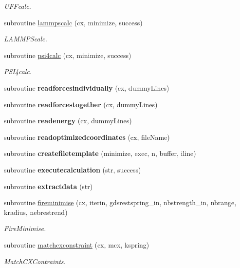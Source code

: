 \begin{DoxyCompactItemize}
\begin{DoxyCompactList}\small\item\em U\+F\+Fcalc. \end{DoxyCompactList}\item 
subroutine \mbox{\hyperlink{namespacepes_a04f0797f2fcc51b261d97b0b2f014254}{lammpscalc}} (cx, minimize, success)
\begin{DoxyCompactList}\small\item\em L\+A\+M\+M\+P\+Scalc. \end{DoxyCompactList}\item 
subroutine \mbox{\hyperlink{namespacepes_af090baa63d75251c8a0d59fa6a0e5ab7}{psi4calc}} (cx, minimize, success)
\begin{DoxyCompactList}\small\item\em P\+S\+I4calc. \end{DoxyCompactList}\item 
\mbox{\label{namespacepes_a3496810618e93c982ad8323a9c065ea8}} 
subroutine {\bfseries readforcesindividually} (cx, dummy\+Lines)
\item 
\mbox{\label{namespacepes_a975ac201244ea09f52437de130b111e2}} 
subroutine {\bfseries readforcestogether} (cx, dummy\+Lines)
\item 
\mbox{\label{namespacepes_adc61696110e289b0a4855b7de2eee923}} 
subroutine {\bfseries readenergy} (cx, dummy\+Lines)
\item 
\mbox{\label{namespacepes_ac7e8fcaa416028b21afaa5a102657105}} 
subroutine {\bfseries readoptimizedcoordinates} (cx, file\+Name)
\item 
\mbox{\label{namespacepes_a3c28a0b18ef26d0a41522e0c0ab88b42}} 
subroutine {\bfseries createfiletemplate} (minimize, exec, n, buffer, iline)
\item 
\mbox{\label{namespacepes_a7518f38a27ed0fe7d940eb9832d4143f}} 
subroutine {\bfseries executecalculation} (str, success)
\item 
\mbox{\label{namespacepes_a3e3f3e53db69ad2009b7c91795f32bf5}} 
subroutine {\bfseries extractdata} (str)
\item 
subroutine \mbox{\hyperlink{namespacepes_ad09cee72e0fef4317231efc6b7cf35fd}{fireminimise}} (cx, iterin, gdsrestspring\+\_\+in, nbstrength\+\_\+in, nbrange, kradius, nebrestrend)
\begin{DoxyCompactList}\small\item\em Fire\+Minimise. \end{DoxyCompactList}\item 
subroutine \mbox{\hyperlink{namespacepes_aacd7a0dc07c19006c3f5e8cfaede7313}{matchcxconstraint}} (cx, mcx, kspring)
\begin{DoxyCompactList}\small\item\em Match\+C\+X\+Contraints. \end{DoxyCompactList}\end{DoxyCompactItemize}
